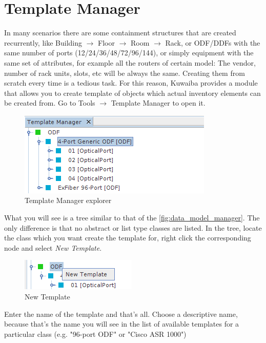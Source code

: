 \documentclass[a4paper]{article}
\begin{document}
	\section{Template Manager} \label{sec:template_manager}
	In many scenarios there are some containment structures that are created recurrently, like Building $\rightarrow$ Floor $\rightarrow$ Room $\rightarrow$ Rack, or ODF/DDFs with the same number of ports (12/24/36/48/72/96/144), or simply equipment with the same set of attributes, for example all the routers of certain model: The vendor, number of rack units, slots, etc will be always the same. Creating them from scratch every time is a tedious task. For this reason, Kuwaiba provides a module that allows you to create template of objects which actual inventory elements can be created from. Go to Tools $\rightarrow$ Template Manager to open it.
	
	\begin{figure}[h!]
		\centering
		\includegraphics[width=0.7\linewidth]{img/template_manager_intro.png}
		\caption{Template Manager explorer}
		\label{fig:template_manager_intro}
	\end{figure}

	What you will see is a tree similar to that of the \ref{fig:data_model_manager}. The only difference is that no abstract or list type classes are listed. In the tree, locate the class which you want create the template for, right click the corresponding node and select \textit{New Template}.
	
	\begin{figure}[h!]
		\centering
		\includegraphics[width=0.4\linewidth]{img/template_manager_new_template.png}
		\caption{New Template}
		\label{fig:template_manager_new_template}
	\end{figure}
	
	Enter the name of the template and that's all. Choose a descriptive name, because that's the name you will see in the list of available templates for a particular class (e.g. "96-port ODF" or "Cisco ASR 1000")
	
\end{document}
